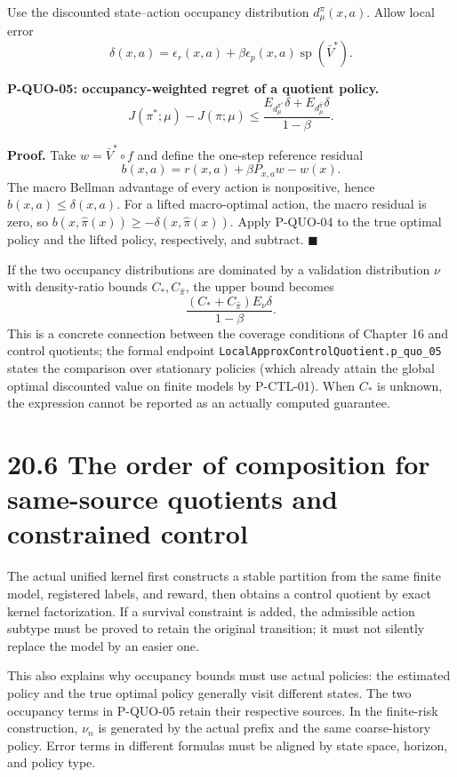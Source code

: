 \documentclass[
  english,
  11pt,
  oneside]{book}
\begin{document}
Use the discounted state--action occupancy distribution \(d_\mu^\pi(x,a)\). Allow local error \[\delta(x,a)=\epsilon_r(x,a)+
\beta\epsilon_p(x,a)\operatorname{sp}(\bar V^*).\]

\hypertarget{p-quo-05}{}\label{p-quo-05}

\textbf{P-QUO-05: occupancy-weighted regret of a quotient policy.} \[J(\pi^*;\mu)-J(\widehat\pi;\mu)
\le\frac{
E_{d_\mu^{\pi^*}}\delta+
E_{d_\mu^{\widehat\pi}}\delta}{1-\beta}.\]

\textbf{Proof.} Take \(w=\bar V^*\circ f\) and define the one-step reference residual \[b(x,a)=r(x,a)+\beta P_{x,a}w-w(x).\] The macro Bellman advantage of every action is nonpositive, hence \(b(x,a)\le\delta(x,a)\). For a lifted macro-optimal action, the macro residual is zero, so \(b(x,\widehat\pi(x))\ge-\delta(x,\widehat\pi(x))\). Apply P-QUO-04 to the true optimal policy and the lifted policy, respectively, and subtract. \(\blacksquare\)

If the two occupancy distributions are dominated by a validation distribution \(\nu\) with density-ratio bounds \(C_*,C_{\widehat\pi}\), the upper bound becomes \[\frac{(C_*+C_{\widehat\pi})E_\nu\delta}{1-\beta}.\] This is a concrete connection between the coverage conditions of Chapter 16 and control quotients; the formal endpoint \nolinkurl{LocalApproxControlQuotient.p_quo_05} states the comparison over stationary policies (which already attain the global optimal discounted value on finite models by P-CTL-01). When \(C_*\) is unknown, the expression cannot be reported as an actually computed guarantee.

\section{20.6 The order of composition for same-source quotients and constrained control}\label{the-order-of-composition-for-same-source-quotients-and-constrained-control}

The actual unified kernel first constructs a stable partition from the same finite model, registered labels, and reward, then obtains a control quotient by exact kernel factorization. If a survival constraint is added, the admissible action subtype must be proved to retain the original transition; it must not silently replace the model by an easier one.

This also explains why occupancy bounds must use actual policies: the estimated policy and the true optimal policy generally visit different states. The two occupancy terms in P-QUO-05 retain their respective sources. In the finite-risk construction, \(\nu_n\) is generated by the actual prefix and the same coarse-history policy. Error terms in different formulas must be aligned by state space, horizon, and policy type.
\end{document}
